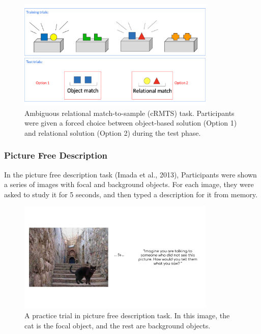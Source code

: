 \documentclass[
  man,floatsintext]{apa6}
\begin{document}
\begin{figure}[!h]

{\centering \includegraphics[width=1\linewidth,height=200px]{CCRR_manuscript_files/appendix_task_examples/e1_crmts} 

}

\caption{Ambiguous relational match-to-sample (cRMTS) task. Participants were given a forced choice between object-based solution (Option 1) and relational solution (Option 2) during the test phase.}\label{fig:crmts-example}
\end{figure}

\hypertarget{picture-free-description-3}{%
\subsubsection{Picture Free Description}\label{picture-free-description-3}}

In the picture free description task (Imada et al., 2013), Participants were shown a series of images with focal and background objects. For each image, they were asked to study it for 5 seconds, and then typed a description for it from memory.

\begin{figure}[!h]

{\centering \includegraphics[width=1\linewidth,height=200px]{CCRR_manuscript_files/appendix_task_examples/e1_fd} 

}

\caption{A practice trial in picture free description task. In this image, the cat is the focal object, and the rest are background objects.}\label{fig:free-description}
\end{figure}
\end{document}
